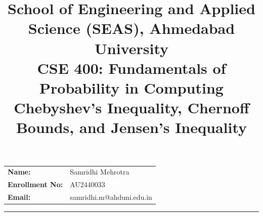 \documentclass[12pt]{article}
\title{
    \normalsize School of Engineering and Applied Science (SEAS), Ahmedabad University \\
    \vspace{0.2cm}
    \textbf{CSE 400: Fundamentals of Probability in Computing}\\
    \Large {Chebyshev’s Inequality, Chernoff Bounds, and Jensen’s Inequality}
}
\author{}
\date{}
\begin{document}
\maketitle

\vspace{-2cm}
\begin{center}
    \begin{tabular}{ll}
        \textbf{Name:} & {Samridhi Mehrotra \hspace{2.5in}} \\ [1.5ex]
        \textbf{Enrollment No:} & {AU2440033 \hspace{2.5in}} \\ [1.5ex]
        \textbf{Email:} & {samridhi.m@ahduni.edu.in \hspace{2.1in}} \\ [1.5ex]
        
    \end{tabular}
\end{center}

\hrule
\vspace{0.5cm}
\end{document}
